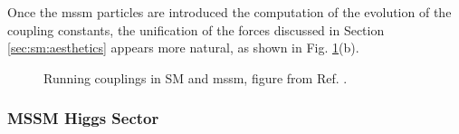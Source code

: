 Once the \gls{mssm} particles are introduced the computation of the evolution of the coupling constants, the unification of the forces discussed in Section \ref{sec:sm:aesthetics} appears more natural, as shown in Fig. \ref{fig:susy:gut}(b).

\begin{figure}[ht]
\centering
{}
\caption{Running couplings in SM and \gls{mssm}, figure from Ref. \cite{Patrignani:2016xqp}.}
\label{fig:susy:gut}
\end{figure}

\subsubsection*{MSSM Higgs Sector}
\label{sec:susy:Higgs}

